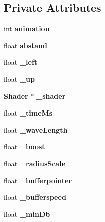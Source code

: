 \subsection*{Private Attributes}
\begin{DoxyCompactItemize}
\item 
int {\bfseries animation}\label{classSoundfieldViewer_1_1ShaderSoundfieldViewer_ac84f87ba680c35bdacd061e8b17a6df1}

\item 
float {\bfseries abstand}\label{classSoundfieldViewer_1_1ShaderSoundfieldViewer_a86a1c0ceced25d8d5ce0ae7bc4faeb7c}

\item 
float {\bfseries \-\_\-left}\label{classSoundfieldViewer_1_1ShaderSoundfieldViewer_a3b3e67f88ddcfb45615d25a971df8c15}

\item 
float {\bfseries \-\_\-up}\label{classSoundfieldViewer_1_1ShaderSoundfieldViewer_a1ded531ddccf7ea94d80b0fdc92debbd}

\item 
{\bf Shader} $\ast$ {\bfseries \-\_\-shader}\label{classSoundfieldViewer_1_1ShaderSoundfieldViewer_a34b7eebd14c5f12c4ce7faed9f7aed5f}

\item 
float {\bfseries \-\_\-time\-Ms}\label{classSoundfieldViewer_1_1ShaderSoundfieldViewer_ae730ee987515d7696d0d77d9793074c4}

\item 
float {\bfseries \-\_\-wave\-Length}\label{classSoundfieldViewer_1_1ShaderSoundfieldViewer_a7fb70566c9c0b1ffd912ac65df655ca1}

\item 
float {\bfseries \-\_\-boost}\label{classSoundfieldViewer_1_1ShaderSoundfieldViewer_aed39229c5b8cd96d529861bda6bfdf08}

\item 
float {\bfseries \-\_\-radius\-Scale}\label{classSoundfieldViewer_1_1ShaderSoundfieldViewer_a23ae111e60a643fee72d46d10b8e8f7d}

\item 
float {\bfseries \-\_\-bufferpointer}\label{classSoundfieldViewer_1_1ShaderSoundfieldViewer_ac58ad8242b21ef0bba1537016da88ed2}

\item 
float {\bfseries \-\_\-bufferspeed}\label{classSoundfieldViewer_1_1ShaderSoundfieldViewer_a3f28936ffcb59e3183d1c3324a6e57ed}

\item 
float {\bfseries \-\_\-min\-Db}\label{classSoundfieldViewer_1_1ShaderSoundfieldViewer_a465d59fa988286d1ba4ed3d303ca85ee}


\end{DoxyCompactItemize}
